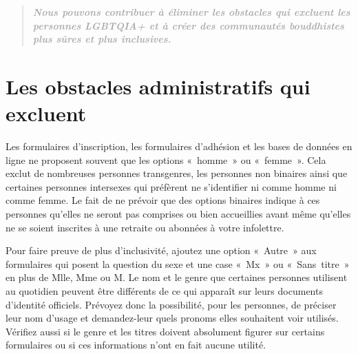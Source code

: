 \documentclass[12pt,openany]{book}
\begin{document}
\begingroup
\addtolength\leftmargin{-0.1in}
\begin{quote}
\doublespacing
\textit{\large \textbf{\textcolor{darkgray}{Nous pouvons contribuer à éliminer les obstacles qui excluent les personnes \mbox{LGBTQIA+} et à créer des communautés bouddhistes plus sûres et plus inclusives.}}}
\end{quote}
\endgroup

\section*{Les obstacles administratifs qui excluent}

\noindent Les formulaires d’inscription, les formulaires d’adhésion et les bases de données en ligne ne proposent souvent que les options \mbox{« homme »} ou \mbox{« femme »}. Cela exclut de nombreuses personnes transgenres, les personnes non binaires ainsi que certaines personnes intersexes qui préfèrent ne s’identifier ni comme homme ni comme femme. Le fait de ne prévoir que des options binaires indique à ces personnes qu’elles ne seront pas comprises ou bien accueillies avant même qu’elles ne se soient inscrites à une retraite ou abonnées à votre infolettre.

Pour faire preuve de plus d’inclusivité, ajoutez une option \mbox{« Autre »} aux formulaires qui posent la question du sexe et une case \mbox{« Mx »} ou \mbox{« Sans titre »} en plus de Mlle, Mme ou M. Le nom et le genre que certaines personnes utilisent au quotidien peuvent être différents de ce qui apparaît sur leurs documents d’identité officiels. Prévoyez donc la possibilité, pour les personnes, de préciser leur nom d’usage et demandez-leur quels pronoms elles souhaitent voir utilisés. Vérifiez aussi si le genre et les titres doivent absolument figurer sur certains formulaires ou si ces informations n’ont en fait aucune utilité.
\end{document}
